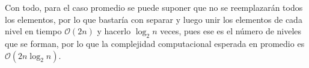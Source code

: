 \documentclass[paper=leter, fontsize=11pt]{scrartcl}
\numberwithin{equation}{section}		%
\numberwithin{figure}{section}			%
\numberwithin{table}{section}				%
\begin{document}
Con todo, para el caso promedio se puede suponer que no se reemplazarán todos los elementos, por lo que bastaría con separar y luego unir los elementos de cada nivel en tiempo $\mathcal{O}(2n)$ y hacerlo $\log_2 n$ veces, pues ese es el número de niveles que se forman, por lo que la complejidad computacional esperada en promedio es $\mathcal{O}(2n \log_2 n)$.




\end{document}
